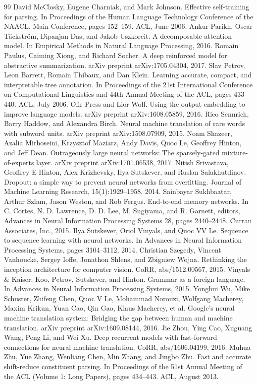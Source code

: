 \documentclass[conference]{IEEEtran}
\begin{document}
\begin{thebibliography}{99}
 David McClosky, Eugene Charniak, and Mark Johnson. Effective self-training for parsing. In Proceedings of the Human Language Technology Conference of the NAACL, Main Conference, pages 152--159. ACL, June 2006.
 Ankur Parikh, Oscar Täckström, Dipanjan Das, and Jakob Uszkoreit. A decomposable attention model. In Empirical Methods in Natural Language Processing, 2016.
 Romain Paulus, Caiming Xiong, and Richard Socher. A deep reinforced model for abstractive summarization. arXiv preprint arXiv:1705.04304, 2017.
 Slav Petrov, Leon Barrett, Romain Thibaux, and Dan Klein. Learning accurate, compact, and interpretable tree annotation. In Proceedings of the 21st International Conference on Computational Linguistics and 44th Annual Meeting of the ACL, pages 433--440. ACL, July 2006.
 Ofir Press and Lior Wolf. Using the output embedding to improve language models. arXiv preprint arXiv:1608.05859, 2016.
 Rico Sennrich, Barry Haddow, and Alexandra Birch. Neural machine translation of rare words with subword units. arXiv preprint arXiv:1508.07909, 2015.
 Noam Shazeer, Azalia Mirhoseini, Krzysztof Maziarz, Andy Davis, Quoc Le, Geoffrey Hinton, and Jeff Dean. Outrageously large neural networks: The sparsely-gated mixture-of-experts layer. arXiv preprint arXiv:1701.06538, 2017.
 Nitish Srivastava, Geoffrey E Hinton, Alex Krizhevsky, Ilya Sutskever, and Ruslan Salakhutdinov. Dropout: a simple way to prevent neural networks from overfitting. Journal of Machine Learning Research, 15(1):1929--1958, 2014.
 Sainbayar Sukhbaatar, Arthur Szlam, Jason Weston, and Rob Fergus. End-to-end memory networks. In C. Cortes, N. D. Lawrence, D. D. Lee, M. Sugiyama, and R. Garnett, editors, Advances in Neural Information Processing Systems 28, pages 2440--2448. Curran Associates, Inc., 2015.
 Ilya Sutskever, Oriol Vinyals, and Quoc VV Le. Sequence to sequence learning with neural networks. In Advances in Neural Information Processing Systems, pages 3104--3112, 2014.
 Christian Szegedy, Vincent Vanhoucke, Sergey Ioffe, Jonathon Shlens, and Zbigniew Wojna. Rethinking the inception architecture for computer vision. CoRR, abs/1512.00567, 2015.
 Vinyals & Kaiser, Koo, Petrov, Sutskever, and Hinton. Grammar as a foreign language. In Advances in Neural Information Processing Systems, 2015.
 Yonghui Wu, Mike Schuster, Zhifeng Chen, Quoc V Le, Mohammad Norouzi, Wolfgang Macherey, Maxim Krikun, Yuan Cao, Qin Gao, Klaus Macherey, et al. Google's neural machine translation system: Bridging the gap between human and machine translation. arXiv preprint arXiv:1609.08144, 2016.
 Jie Zhou, Ying Cao, Xuguang Wang, Peng Li, and Wei Xu. Deep recurrent models with fast-forward connections for neural machine translation. CoRR, abs/1606.04199, 2016.
 Muhua Zhu, Yue Zhang, Wenliang Chen, Min Zhang, and Jingbo Zhu. Fast and accurate shift-reduce constituent parsing. In Proceedings of the 51st Annual Meeting of the ACL (Volume 1: Long Papers), pages 434--443. ACL, August 2013.
\end{thebibliography}
\end{document}
